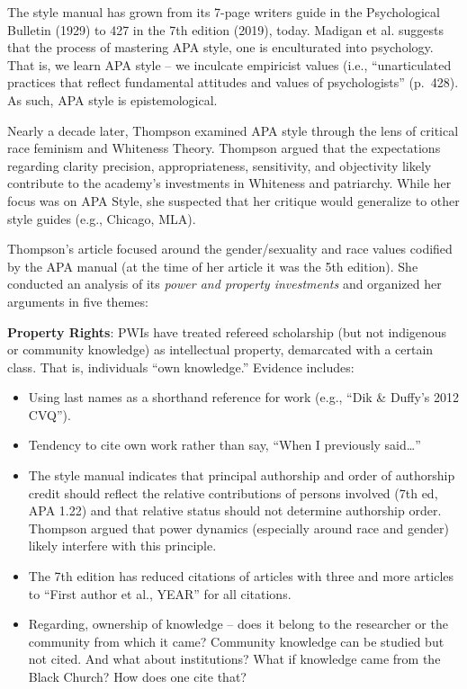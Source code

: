 \documentclass[
  11pt,
]{book}
\providecommand{\tightlist}{%
  \setlength{\itemsep}{0pt}\setlength{\parskip}{0pt}}
\begin{document}
The style manual has grown from its 7-page writers guide in the Psychological Bulletin (1929) to 427 in the 7th edition (2019), today. Madigan et al. \citeyearpar{madigan_language_1995} suggests that the process of mastering APA style, one is enculturated into psychology. That is, we learn APA style -- we inculcate empiricist values (i.e., ``unarticulated practices that reflect fundamental attitudes and values of psychologists'' (p.~428). As such, APA style is epistemological.

Nearly a decade later, Thompson \citeyearpar{thompson_gentlemanly_2004} examined APA style through the lens of critical race feminism and Whiteness Theory. Thompson argued that the expectations regarding clarity precision, appropriateness, sensitivity, and objectivity likely contribute to the academy's investments in Whiteness and patriarchy. While her focus was on APA Style, she suspected that her critique would generalize to other style guides (e.g., Chicago, MLA).

Thompson's \citeyearpar{thompson_gentlemanly_2004} article focused around the gender/sexuality and race values codified by the APA manual (at the time of her article it was the 5th edition). She conducted an analysis of its \emph{power and property investments} and organized her arguments in five themes:

\textbf{Property Rights}: PWIs have treated refereed scholarship (but not indigenous or community knowledge) as intellectual property, demarcated with a certain class. That is, individuals ``own knowledge.'' Evidence includes:

\begin{itemize}
\tightlist
\item
  Using last names as a shorthand reference for work (e.g., ``Dik \& Duffy's 2012 CVQ'').
\item
  Tendency to cite own work rather than say, ``When I previously said\ldots{}''
\item
  The style manual indicates that principal authorship and order of authorship credit should reflect the relative contributions of persons involved (7th ed, APA 1.22) and that relative status should not determine authorship order. Thompson argued that power dynamics (especially around race and gender) likely interfere with this principle.
\item
  The 7th edition has reduced citations of articles with three and more articles to ``First author et al., YEAR'' for all citations.\\
\item
  Regarding, ownership of knowledge -- does it belong to the researcher or the community from which it came? Community knowledge can be studied but not cited. And what about institutions? What if knowledge came from the Black Church? How does one cite that?
\end{itemize}
\end{document}
